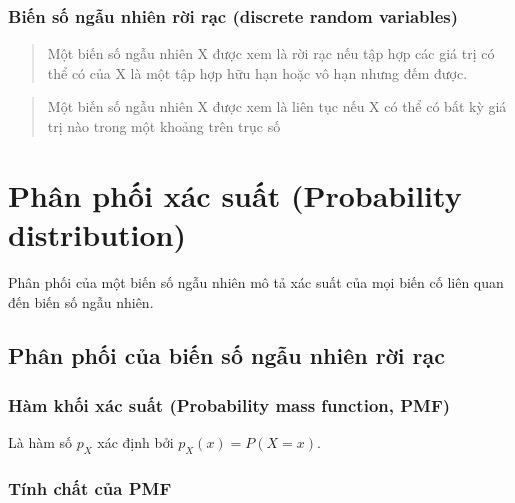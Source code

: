 \documentclass[
]{book}
\begin{document}
\hypertarget{biux1ebfn-sux1ed1-ngux1eabu-nhiuxean-rux1eddi-rux1ea1c-discrete-random-variables}{%
\subsubsection{Biến số ngẫu nhiên rời rạc (discrete random variables)}\label{biux1ebfn-sux1ed1-ngux1eabu-nhiuxean-rux1eddi-rux1ea1c-discrete-random-variables}}

\begin{quote}
Một biến số ngẫu nhiên X được xem là rời rạc nếu tập hợp các giá trị có thể có của X là một tập hợp hữu hạn hoặc vô hạn nhưng đếm được.
\end{quote}

\begin{quote}
Một biến số ngẫu nhiên X được xem là liên tục nếu X có thể có bất kỳ giá trị nào trong một khoảng trên trục số
\end{quote}

\hypertarget{phuxe2n-phux1ed1i-xuxe1c-suux1ea5t-probability-distribution}{%
\section{Phân phối xác suất (Probability distribution)}\label{phuxe2n-phux1ed1i-xuxe1c-suux1ea5t-probability-distribution}}

Phân phối của một biến số ngẫu nhiên mô tả xác suất của mọi biến cố liên quan đến biến số ngẫu nhiên.

\hypertarget{phuxe2n-phux1ed1i-cux1ee7a-biux1ebfn-sux1ed1-ngux1eabu-nhiuxean-rux1eddi-rux1ea1c}{%
\subsection{Phân phối của biến số ngẫu nhiên rời rạc}\label{phuxe2n-phux1ed1i-cux1ee7a-biux1ebfn-sux1ed1-ngux1eabu-nhiuxean-rux1eddi-rux1ea1c}}

\hypertarget{huxe0m-khux1ed1i-xuxe1c-suux1ea5t-probability-mass-function-pmf}{%
\subsubsection{Hàm khối xác suất (Probability mass function, PMF)}\label{huxe0m-khux1ed1i-xuxe1c-suux1ea5t-probability-mass-function-pmf}}

Là hàm số \(p_X\) xác định bởi \(p_X(x) = P(X = x)\).

\hypertarget{tuxednh-chux1ea5t-cux1ee7a-pmf}{%
\subsubsection{Tính chất của PMF}\label{tuxednh-chux1ea5t-cux1ee7a-pmf}}
\end{document}
